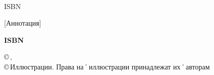 \begin{titlepage}
	\vfill
	\noindent
	\hspace{1em}\hphantom{\AuthorMark}
	{\bfseries\AuthorAbbrB}
	
	\noindent
	\AuthorMark\hspace{1em}
	\begin{minipage}[t]{\linewidth-1em-\widthof{\AuthorMark}}
		{\hspace{1.5em}\BibInfo\\[1ex]}
		{\hspace{1.5em}ISBN \ISBN}
	\end{minipage}
	
	\vfill
	\noindent
	\hspace{1em}\hphantom{\AuthorMark}
	\begin{minipage}[t]{\linewidth-1em-\widthof{\AuthorMark}}
		\small	[Аннотация] 		
	\end{minipage}
		
	\noindent	
	\begin{flushright}
		\bibInd{\UDK}{\BBK}{}	
	\end{flushright}
	
	\vfill
	\noindent
	\parbox[b]{.4\linewidth}{\small\bfseries ISBN \ISBN}
	\hfill
	\parbox[b]{.5\linewidth}
	{\raggedright\small
	 ©\,\AuthorAbbrA, \YearPub\\
	 ©\,Иллюстрации. Права на˚иллюстрации принадлежат их˚авторам	
	}
	
\end{titlepage}
